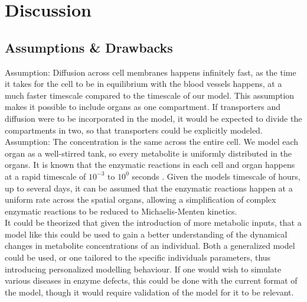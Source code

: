 \documentclass{IEEEtran}
\begin{document}
\section{Discussion}

\subsection{Assumptions \& Drawbacks}





Assumption: Diffusion across cell membranes happens infinitely fast, as the time it takes for the cell to be in equilibrium with the blood vessels happens, at a much faster timescale compared to the timescale of our model. This assumption makes it possible to include organs as one compartment. If transporters and diffusion were to be incorporated in the model, it would be expected to divide the compartments in two, so that transporters could be explicitly modeled.\\

Assumption: The concentration is the same across the entire cell. We model each organ as a well-stirred tank, so every metabolite is uniformly distributed in the organs. It is known that the enzymatic reactions in each cell and organ happens at a rapid timescale of $10^{-3} \text{ to } 10^0$ seconds \cite{yasemi_jolicoeur_2021}. Given the models timescale of hours, up to several days, it can be assumed that the enzymatic reactions happen at a uniform rate across the spatial organs, allowing a simplification of complex enzymatic reactions to be reduced to Michaelis-Menten kinetics. \\




It could be theorized that given the introduction of more metabolic inputs, that a model like this could be used to gain a better understanding of the dynamical changes in metabolite concentrations of an individual. Both a generalized model could be used, or one tailored to the specific individuals parameters, thus introducing personalized modelling behaviour. If one would wish to simulate various diseases in enzyme defects, this could be done with the current format of the model, though it would require validation of the model for it to be relevant. \\
\end{document}
